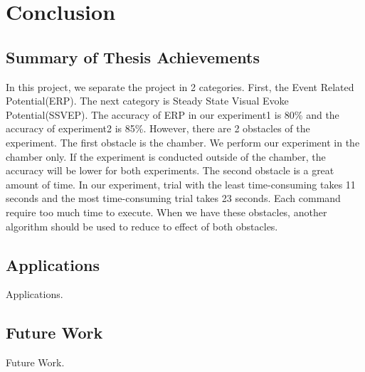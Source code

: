 \chapter{Conclusion}

\label{ch:conclusions}

\section{Summary of Thesis Achievements}

\hspace{1.5cm}In this project, we separate the project in 2 categories. First, the Event Related Potential(ERP). The next category is Steady State Visual Evoke Potential(SSVEP). The accuracy of ERP in our experiment1 is 80\% and the accuracy of experiment2 is 85\%. However, there are 2 obstacles of the experiment. The first obstacle is the chamber. We perform our experiment in the chamber only. If the experiment is conducted outside of the chamber, the accuracy will be lower for both experiments. The second obstacle is a great amount of time. In our experiment, trial with the least time-consuming takes 11 seconds and the most time-consuming trial takes 23 seconds. Each command require too much time to execute. When we have these obstacles, another algorithm should be used to reduce to effect of both obstacles.

\section{Applications}

Applications.


\section{Future Work}

Future Work.